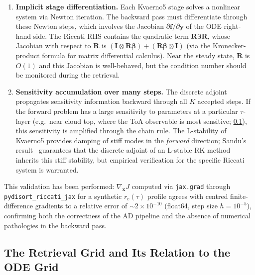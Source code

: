 \documentclass[11pt,a4paper]{article}
\newcommand{\vect}[1]{\bm{#1}}
\newcommand{\mat}[1]{\mathbf{#1}}
\theoremstyle{definition}
\begin{document}
\begin{enumerate}
  \item \textbf{Implicit stage differentiation.}  Each Kvaerno5 stage
    solves a nonlinear system via Newton iteration.  The backward pass
    must differentiate through these Newton steps, which involves the
    Jacobian $\partial\vect{f}/\partial\vect{y}$ of the ODE
    right-hand side.  The Riccati RHS contains the quadratic term
    $\mat{R}\mat{\beta}\mat{R}$, whose Jacobian with respect to
    $\mat{R}$ is $(\mat{I} \otimes \mat{R}\mat{\beta}) +
    (\mat{R}\mat{\beta} \otimes \mat{I})$ (via the Kronecker-product
    formula for matrix differential calculus).  Near the steady state,
    $\mat{R}$ is $O(1)$ and this Jacobian is well-behaved, but the
    condition number should be monitored during the retrieval.

  \item \textbf{Sensitivity accumulation over many steps.}  The discrete
    adjoint propagates sensitivity information backward through all
    $K$ accepted steps.  If the forward problem has a large sensitivity
    to parameters at a particular $\tau$-layer (e.g.\ near cloud top,
    where the ToA observable is most sensitive; \cref{sec:retrieval-grid}),
    this sensitivity is amplified
    through the chain rule.  The L-stability of Kvaerno5 provides
    damping of stiff modes in the \emph{forward} direction; Sandu's
    result~\cite{sandu2006} guarantees that the discrete adjoint of an
    L-stable RK method inherits this stiff stability, but empirical
    verification for the specific Riccati system is warranted.
\end{enumerate}

This validation has been performed: $\nabla_{\!\vect{x}} J$ computed via
\texttt{jax.grad} through \texttt{pydisort\_riccati\_jax} for a synthetic
$r_e(\tau)$ profile agrees with centred finite-difference gradients to a
relative error of ${\sim}2\times 10^{-10}$ (float64, step size
$h = 10^{-5}$), confirming both the correctness of the AD pipeline and
the absence of numerical pathologies in the backward pass.

\subsection{The Retrieval Grid and Its Relation to the ODE Grid}\label{sec:retrieval-grid}
\end{document}
